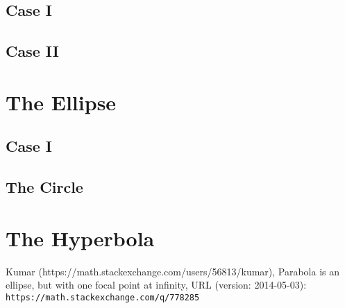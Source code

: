\documentclass[11pt]{article}
\begin{document}
	\subsection{Case I}
\pagebreak	

	\subsection{Case II}
\pagebreak

\section{The Ellipse}
\pagebreak	

	\subsection{Case I}
\pagebreak

	\subsection{The Circle}
\pagebreak

\section{The Hyperbola}
\pagebreak

\begin{thebibliography}{1}
	\begin{flushleft}
	Kumar (https://math.stackexchange.com/users/56813/kumar), Parabola is an ellipse, but with one focal point at infinity, URL (version: 2014-05-03): \texttt{https://math.stackexchange.com/q/778285}\end{flushleft}
\end{thebibliography}
\end{document}
